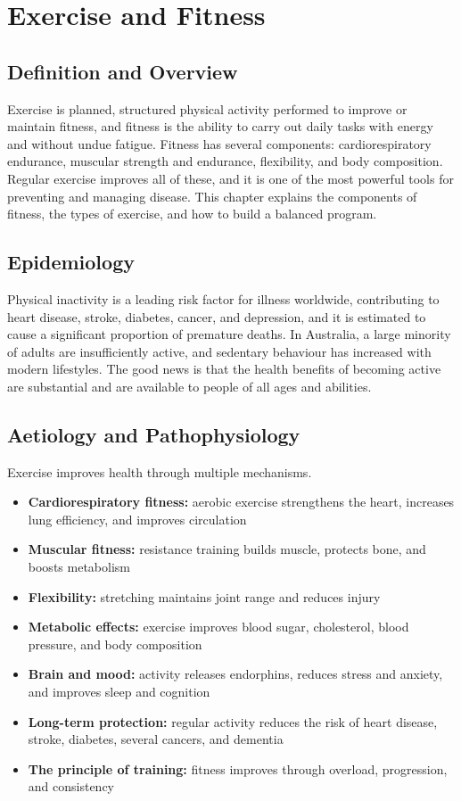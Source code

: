 \chapter{Exercise and Fitness}

\section*{Definition and Overview}
Exercise is planned, structured physical activity performed to improve or maintain fitness, and fitness is the ability to carry out daily tasks with energy and without undue fatigue. Fitness has several components: cardiorespiratory endurance, muscular strength and endurance, flexibility, and body composition. Regular exercise improves all of these, and it is one of the most powerful tools for preventing and managing disease. This chapter explains the components of fitness, the types of exercise, and how to build a balanced program.

\section*{Epidemiology}
Physical inactivity is a leading risk factor for illness worldwide, contributing to heart disease, stroke, diabetes, cancer, and depression, and it is estimated to cause a significant proportion of premature deaths. In Australia, a large minority of adults are insufficiently active, and sedentary behaviour has increased with modern lifestyles. The good news is that the health benefits of becoming active are substantial and are available to people of all ages and abilities.

\section*{Aetiology and Pathophysiology}
Exercise improves health through multiple mechanisms.
\begin{itemize}
    \item \textbf{Cardiorespiratory fitness:} aerobic exercise strengthens the heart, increases lung efficiency, and improves circulation
    \item \textbf{Muscular fitness:} resistance training builds muscle, protects bone, and boosts metabolism
    \item \textbf{Flexibility:} stretching maintains joint range and reduces injury
    \item \textbf{Metabolic effects:} exercise improves blood sugar, cholesterol, blood pressure, and body composition
    \item \textbf{Brain and mood:} activity releases endorphins, reduces stress and anxiety, and improves sleep and cognition
    \item \textbf{Long-term protection:} regular activity reduces the risk of heart disease, stroke, diabetes, several cancers, and dementia
    \item \textbf{The principle of training:} fitness improves through overload, progression, and consistency
\end{itemize}

